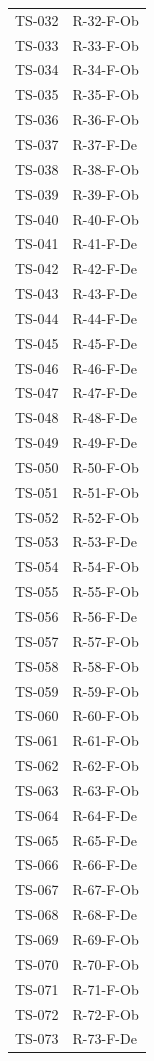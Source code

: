 \documentclass[a4paper, 11pt]{article}
\begin{document}
\begin{longtable}{>{\centering\arraybackslash}m{2.5cm} >{\centering\arraybackslash}m{3.5cm}}
TS-032 & R-32-F-Ob \\
TS-033 & R-33-F-Ob \\
TS-034 & R-34-F-Ob \\
TS-035 & R-35-F-Ob \\
TS-036 & R-36-F-Ob \\
TS-037 & R-37-F-De \\
TS-038 & R-38-F-Ob \\
TS-039 & R-39-F-Ob \\
TS-040 & R-40-F-Ob \\
TS-041 & R-41-F-De \\
TS-042 & R-42-F-De \\
TS-043 & R-43-F-De \\
TS-044 & R-44-F-De \\
TS-045 & R-45-F-De \\
TS-046 & R-46-F-De \\
TS-047 & R-47-F-De \\
TS-048 & R-48-F-De \\
TS-049 & R-49-F-De \\
TS-050 & R-50-F-Ob \\
TS-051 & R-51-F-Ob \\
TS-052 & R-52-F-Ob \\
TS-053 & R-53-F-De \\
TS-054 & R-54-F-Ob \\
TS-055 & R-55-F-Ob \\
TS-056 & R-56-F-De \\
TS-057 & R-57-F-Ob \\
TS-058 & R-58-F-Ob \\
TS-059 & R-59-F-Ob \\
TS-060 & R-60-F-Ob \\
TS-061 & R-61-F-Ob \\
TS-062 & R-62-F-Ob \\
TS-063 & R-63-F-Ob \\
TS-064 & R-64-F-De \\
TS-065 & R-65-F-De \\
TS-066 & R-66-F-De \\
TS-067 & R-67-F-Ob \\
TS-068 & R-68-F-De \\
TS-069 & R-69-F-Ob \\
TS-070 & R-70-F-Ob \\
TS-071 & R-71-F-Ob \\
TS-072 & R-72-F-Ob \\
TS-073 & R-73-F-De \\

\end{longtable}
\end{document}
